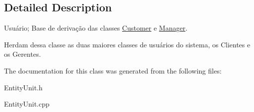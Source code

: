 \subsection{Detailed Description}
Usuário; Base de derivação das classes \hyperlink{classCustomer}{Customer} e \hyperlink{classManager}{Manager}. 

Herdam dessa classe as duas maiores classes de usuários do sistema, os Clientes e os Gerentes. 

The documentation for this class was generated from the following files\-:\begin{DoxyCompactItemize}
\item 
Entity\-Unit.\-h\item 
Entity\-Unit.\-cpp\end{DoxyCompactItemize}
